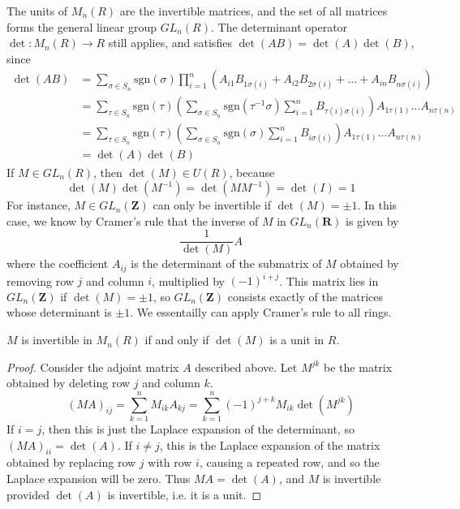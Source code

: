 The units of $M_n(R)$ are the invertible matrices, and the set of all matrices forms the general linear group $GL_n(R)$. The determinant operator $\det: M_n(R) \to R$ still applies, and satisfies $\det(AB) = \det(A) \det(B)$, since
%
\begin{align*}
    \det(AB) &= \sum_{\sigma \in S_n} \text{sgn}(\sigma) \prod_{i = 1}^n (A_{i1} B_{1\sigma(i)} + A_{i2} B_{2 \sigma(i)} + \dots + A_{in} B_{n \sigma(i)})\\
    &= \sum_{\tau \in S_n} \text{sgn}(\tau) \left( \sum_{\sigma \in S_n} \text{sgn}(\tau^{-1} \sigma) \sum_{i = 1}^n B_{\tau(i) \sigma(i)} \right) A_{1\tau(1)} \dots A_{n \tau(n)}\\
    &= \sum_{\tau \in S_n} \text{sgn}(\tau) \left( \sum_{\sigma \in S_n} \text{sgn}(\sigma) \sum_{i = 1}^n B_{i \sigma(i)} \right) A_{1\tau(1)} \dots A_{n \tau(n)}\\
    &= \det(A) \det(B)
\end{align*}
%
If $M \in GL_n(R)$, then $\det(M) \in U(R)$, because
%
\[ \det(M) \det(M^{-1}) = \det(MM^{-1}) = \det(I) = 1 \]
%
For instance, $M \in GL_n(\mathbf{Z})$ can only be invertible if $\det(M) = \pm 1$. In this case, we know by Cramer's rule that the inverse of $M$ in $GL_n(\mathbf{R})$ is given by
%
\[ \frac{1}{\det(M)} A \]
%
where the coefficient $A_{ij}$ is the determinant of the submatrix of $M$ obtained by removing row $j$ and column $i$, multiplied by $(-1)^{i+j}$. This matrix lies in $GL_n(\mathbf{Z})$ if $\det(M) = \pm 1$, so $GL_n(\mathbf{Z})$ consists exactly of the matrices whose determinant is $\pm 1$. We essentailly can apply Cramer's rule to all rings.

\begin{theorem}
    $M$ is invertible in $M_n(R)$ if and only if $\det(M)$ is a unit in $R$.
\end{theorem}
\begin{proof}
    Consider the adjoint matrix $A$ described above. Let $M^{jk}$ be the matrix obtained by deleting row $j$ and column $k$.
    \[ (MA)_{ij} = \sum_{k = 1}^n M_{ik} A_{kj} = \sum_{k = 1}^n (-1)^{j + k} M_{ik} \det(M^{jk}) \]
    If $i = j$, then this is just the Laplace expansion of the determinant, so $(MA)_{ii} = \det(A)$. If $i \neq j$, this is the Laplace expansion of the matrix obtained by replacing row $j$ with row $i$, causing a repeated row, and so the Laplace expansion will be zero. Thus $MA = \det(A)$, and $M$ is invertible provided $\det(A)$ is invertible, i.e. it is a unit.
\end{proof}

